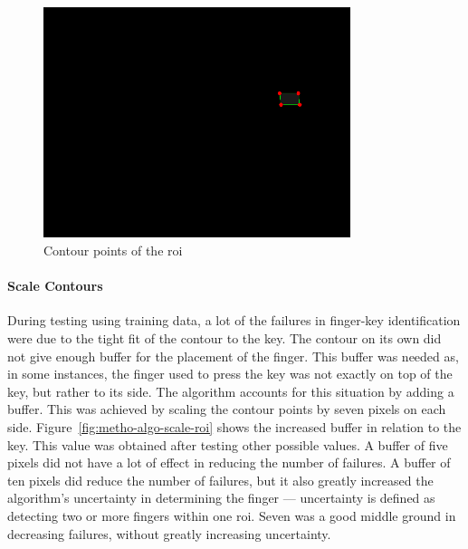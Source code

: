 \documentclass{report}
\begin{document}
\begin{figure}[H]
	\centering
	\includegraphics[width=0.8\textwidth]{key-contour.png}
	\caption{Contour points of the \ac{roi}}
	\label{fig:metho-algo-contour-key}
	\centering
\end{figure}

\paragraph{Scale Contours}
During testing using training data, a lot of the failures in finger-key
identification were due to the tight fit of the contour to the key. The contour
on its own did not give enough buffer for the placement of the finger. This
buffer was needed as, in some instances, the finger used to press the key was
not exactly on top of the key, but rather to its side. The algorithm accounts
for this situation by adding a buffer. This was achieved by scaling the contour
points by seven pixels on each side. Figure~\ref{fig:metho-algo-scale-roi} shows
the increased buffer in relation to the key. This value was obtained after
testing other possible values. A buffer of five pixels did not have a lot of
effect in reducing the number of failures. A buffer of ten pixels did reduce the
number of failures, but it also greatly increased the algorithm's uncertainty in
determining the finger --- uncertainty is defined as detecting two or more
fingers within one \ac{roi}. Seven was a good middle ground in decreasing
failures, without greatly increasing uncertainty.
\end{document}
